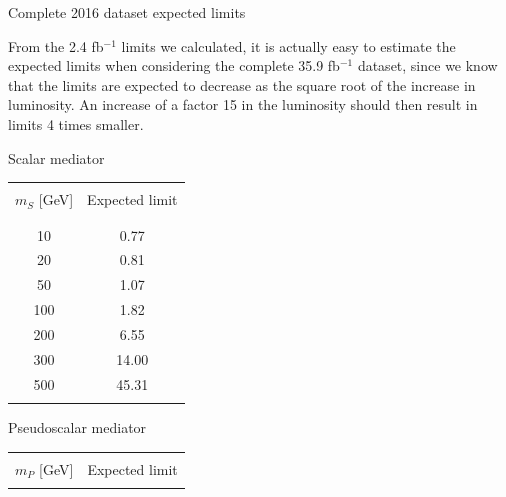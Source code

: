 \documentclass[handout,8 pt]{beamer}
\begin{document}
\begin{frame}{Complete 2016 dataset expected limits}

	\justifying
	From the 2.4 fb$^{-1}$ limits we calculated, it is actually easy to estimate the expected limits when considering the complete 35.9 fb$^{-1}$ dataset, since we know that the limits are expected to decrease as the square root of the increase in luminosity. An increase of a factor 15 in the luminosity should then result in limits 4 times smaller. \vfill

   \begin{center}
   	 \begin{minipage}[c]{.48\linewidth}
	 \begin{exampleblock}{} { \begin{center} Scalar mediator \end{center}} \end{exampleblock}
    	\begin{center}
   	\begin{tabular}{c|c}
		& \\
		$m_S$ [GeV]& Expected limit  \\ 
		& \\ 
		\hline \hline
		& \\
		10 &  0.77\\
            	20 &  0.81\\
            	50 & 1.07 \\
            	100 & 1.82  \\
            	200 & 6.55 \\
            	300 & 14.00\\
            	500 & 45.31 \\
		& \\
          \end{tabular}
          \end{center}
   \end{minipage} \hfill
   \begin{minipage}[c]{.48\linewidth}
   	\begin{exampleblock}{} { \begin{center} Pseudoscalar mediator \end{center}} \end{exampleblock}
   	\begin{center}
   	\begin{tabular}{c|c}
		& \\
		$m_P$ [GeV]& Expected limit  \\ 
		& \\ 

\end{tabular}
\end{center}
\end{minipage}
\end{center}
\end{frame}
\end{document}
